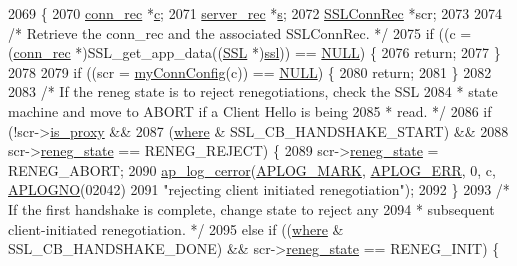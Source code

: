 \begin{DoxyCode}
2069 \{
2070     \hyperlink{structconn__rec}{conn\_rec} *\hyperlink{group__APACHE__CORE__HTTPD_ga7cce37ef8558e46f408cb4d0f555605b}{c};
2071     \hyperlink{structserver__rec}{server\_rec} *\hyperlink{group__APACHE__CORE__LISTEN_ga9359ed159c8b295541e3770172d34550}{s};
2072     \hyperlink{structSSLConnRec}{SSLConnRec} *scr;
2073 
2074     \textcolor{comment}{/* Retrieve the conn\_rec and the associated SSLConnRec. */}
2075     \textcolor{keywordflow}{if} ((c = (\hyperlink{structconn__rec}{conn\_rec} *)SSL\_get\_app\_data((\hyperlink{group__MOD__SSL_gac05889312301718b3fc106564942ad68}{SSL} *)\hyperlink{group__MOD__SSL_ga91d808d6c1c01029f9c9260b9b69a437}{ssl})) == \hyperlink{pcre_8txt_ad7f989d16aa8ca809a36bc392c07fba1}{NULL}) \{
2076         \textcolor{keywordflow}{return};
2077     \}
2078 
2079     \textcolor{keywordflow}{if} ((scr = \hyperlink{group__MOD__SSL__PRIVATE_ga8a3e05c43e4243e56d3f1f6ee3f2d579}{myConnConfig}(c)) == \hyperlink{pcre_8txt_ad7f989d16aa8ca809a36bc392c07fba1}{NULL}) \{
2080         \textcolor{keywordflow}{return};
2081     \}
2082 
2083     \textcolor{comment}{/* If the reneg state is to reject renegotiations, check the SSL}
2084 \textcolor{comment}{     * state machine and move to ABORT if a Client Hello is being}
2085 \textcolor{comment}{     * read. */}
2086     \textcolor{keywordflow}{if} (!scr->\hyperlink{structSSLConnRec_a0440848cf22edd01ea3d27a239f4062b}{is\_proxy} &&
2087         (\hyperlink{group__apr__file__io_ga36413100270e49e571f3f52170bc5a1f}{where} & SSL\_CB\_HANDSHAKE\_START) &&
2088         scr->\hyperlink{structSSLConnRec_ad36678f508db0c5a628b6a99a76bf3c0}{reneg\_state} == RENEG\_REJECT) \{
2089             scr->\hyperlink{structSSLConnRec_ad36678f508db0c5a628b6a99a76bf3c0}{reneg\_state} = RENEG\_ABORT;
2090             \hyperlink{group__APACHE__CORE__LOG_ga60ef6919b8e1b691b0c1ac4d67c9449f}{ap\_log\_cerror}(\hyperlink{group__APACHE__CORE__LOG_ga655e126996849bcb82e4e5a14c616f4a}{APLOG\_MARK}, \hyperlink{group__APACHE__CORE__LOG_ga57ad94ed8c92c4306de90479251a5d58}{APLOG\_ERR}, 0, c, 
      \hyperlink{group__APACHE__CORE__LOG_ga1dee8a07e06bc5b3de8b89662c2cd666}{APLOGNO}(02042)
2091                           \textcolor{stringliteral}{"rejecting client initiated renegotiation"});
2092     \}
2093     \textcolor{comment}{/* If the first handshake is complete, change state to reject any}
2094 \textcolor{comment}{     * subsequent client-initiated renegotiation. */}
2095     \textcolor{keywordflow}{else} \textcolor{keywordflow}{if} ((\hyperlink{group__apr__file__io_ga36413100270e49e571f3f52170bc5a1f}{where} & SSL\_CB\_HANDSHAKE\_DONE) && scr->\hyperlink{structSSLConnRec_ad36678f508db0c5a628b6a99a76bf3c0}{reneg\_state} == RENEG\_INIT) \{

\end{DoxyCode}
